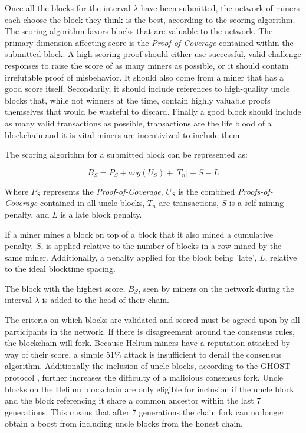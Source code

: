 \documentclass[10pt, nonatbib, nocopyrightspace, reprint]{sigplanconf}
\begin{document}
Once all the blocks for the interval $\lambda$ have been submitted, the network of miners each choose the block they think is the best, according to the scoring algorithm. The scoring algorithm favors blocks that are valuable to the network. The primary dimension affecting score is the \emph{Proof-of-Coverage} contained within the submitted block. A high scoring proof should either use successful, valid challenge responses to raise the score of as many miners as possible, or it should contain irrefutable proof of misbehavior. It should also come from a miner that has a good score itself. Secondarily, it should include references to high-quality uncle blocks that, while not winners at the time, contain highly valuable proofs themselves that would be wasteful to discard. Finally a good block should include as many valid transactions as possible, transactions are the life blood of a blockchain and it is vital miners are incentivized to include them.

The scoring algorithm for a submitted block can be represented as:

\[B_S = P_S + avg(U_S) + |T_n|  - S - L \]

Where $P_S$ represents the \emph{Proof-of-Coverage}, $U_S$ is the combined \emph{Proofs-of-Coverage} contained in all uncle blocks, $T_n$ are transactions, $S$ is a self-mining penalty, and $L$ is a late block penalty.

If a miner mines a block on top of a block that it also mined  a cumulative penalty, $S$, is applied relative to the number of blocks in a row mined by the same miner. Additionally, a penalty applied for the block being 'late', $L$, relative to the ideal blocktime spacing.

The block with the highest score, $B_S$, seen by miners on the network during the interval $\lambda$ is added to the head of their chain.

The criteria on which blocks are validated and scored must be agreed upon by all participants in the network. If there is disagreement around the consensus rules, the blockchain will fork. Because Helium miners have a reputation attached by way of their score, a simple 51\% attack is insufficient to derail the consensus algorithm. Additionally the inclusion of uncle blocks, according to the GHOST protocol \cite{ghost}, further increases the difficulty of a malicious consensus fork. Uncle blocks on the Helium blockchain are only eligible for inclusion if the uncle block and the block referencing it share a common ancestor within the last 7 generations. This means that after 7 generations the chain fork can no longer obtain a boost from including uncle blocks from the honest chain.
\end{document}
